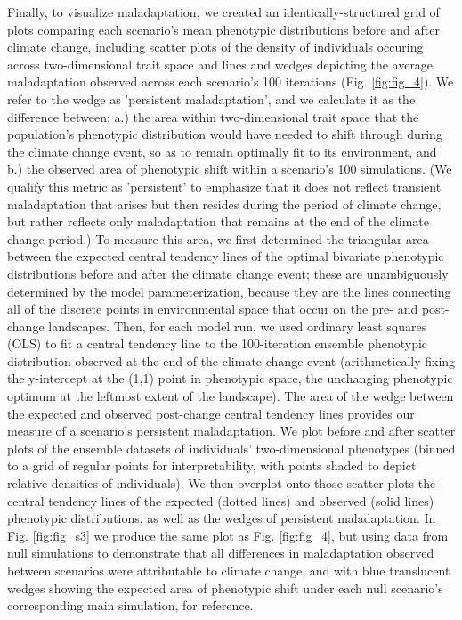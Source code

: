 \documentclass[9pt,twocolumn,twoside,lineno]{pnas-new}
\begin{document}
{Finally, to visualize maladaptation, we created an identically-structured
grid of plots comparing each scenario's
mean phenotypic distributions before and after climate change,
including scatter plots of the density of individuals occuring across
two-dimensional trait space and lines and wedges depicting the average maladaptation
observed across each scenario's 100 iterations (Fig. \ref{fig:fig_4}).
We refer to the wedge as 'persistent maladaptation',
and we calculate it as the difference between: a.) the area 
within two-dimensional trait space that the population’s phenotypic distribution 
would have needed to shift through during the climate change event, so as to remain 
optimally fit to its environment, and b.) the observed area of phenotypic shift within
a scenario's 100 simulations.
(We qualify this metric as 'persistent' to emphasize that it does
not reflect transient maladaptation that arises but then
resides during the period of climate change, but rather reflects
only maladaptation that remains at the end of the climate change period.)
To measure this area, we first determined the triangular area between 
the expected central tendency lines of the optimal bivariate phenotypic distributions
before and after the climate change event;
these are unambiguously determined by the model parameterization, because
they are the lines connecting all of the discrete 
points in environmental space that occur on the pre- and post-change landscapes.
Then, for each model run, we used ordinary least squares (OLS)
to fit a central tendency line to the 100-iteration ensemble phenotypic distribution
observed at the end of the climate change event
(arithmetically fixing the y-intercept at the (1,1) point in phenotypic 
space, the unchanging phenotypic optimum at the leftmost extent of the landscape).
The area of the wedge between the expected and observed post-change central tendency
lines provides our measure of a scenario's persistent maladaptation.
We plot before and after scatter plots of the ensemble datasets
of individuals' two-dimensional phenotypes
(binned to a grid of regular points for interpretability, with points
shaded to depict relative densities of individuals).
We then overplot onto those scatter plots the central tendency lines of
the expected (dotted lines) and observed (solid lines) phenotypic distributions,
as well as the wedges of persistent maladaptation.
In Fig. \ref{fig:fig_s3} we produce the same plot as Fig. \ref{fig:fig_4},
but using data from null simulations to demonstrate that all differences
in maladaptation observed between scenarios were attributable to climate change,
and with blue translucent wedges showing the expected area of phenotypic shift
under each null scenario's corresponding main simulation, for reference.

}
\end{document}

